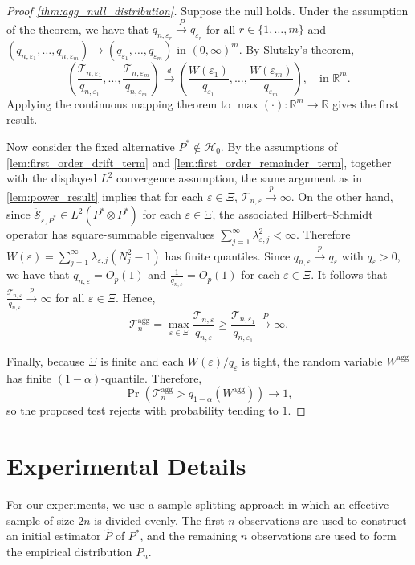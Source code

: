 \documentclass{article}
\theoremstyle{plain}
\theoremstyle{definition}
\theoremstyle{remark}
\newcommand{\R}{\mathbb{R}}
\newcommand{\of}[1]{\left(#1\right)}
\newcommand{\cT}{\mathcal{T}}
\newcommand{\hP}{\widehat{P}}
\newcommand{\1}{\mathbbm{1}}
\newcommand{\STE}{\mathscr{S}}
\newcommand{\eps}{\varepsilon}
\theoremstyle{plain}
\theoremstyle{definition}
\newcommand{\agg}{\textrm{agg}}
\begin{document}
\begin{proof}[Proof \cref{thm:agg_null_distribution}]
  
    Suppose the null holds. Under the assumption of the theorem, we have that $q_{n, \eps_r} \xrightarrow[]{P} q_{\eps_r}$ for all $r \in \{1, \dots, m\}$ and $(q_{n, \eps_1}, \dots, q_{n, \eps_m}) \to (q_{\eps_1}, \dots, q_{\eps_m})$ in $(0, \infty)^m$. 
    By Slutsky's theorem,
    \[
        \of{\frac{\cT_{n, \eps_1}}{q_{n, \eps_1}}, \dots, \frac{\cT_{n, \eps_m}}{q_{n, \eps_m}}} \xrightarrow[]{d} \of{\frac{W(\eps_1)}{q_{\eps_1}}, \dots, \frac{W(\eps_m)}{q_{\eps_m}}}, \quad \text{in } \R^m.
    \]
    Applying the continuous mapping theorem to $\max(\cdot) : \R^m\to \R$ gives the first result.   

    Now consider the fixed alternative $P^*\notin\mathcal H_0$.
    By the assumptions of \cref{lem:first_order_drift_term} and \cref{lem:first_order_remainder_term}, together with the
    displayed $L^2$ convergence assumption, the same argument as in
    \cref{lem:power_result} implies that for each $\eps \in \Xi$, $\mathcal T_{n,\eps}\xrightarrow{p}\infty$.
    On the other hand, since
    $\ddot{\STE}_{\eps,P^*}\in L^2(P^*\otimes P^*)$ for each $\eps\in\Xi$,
    the associated Hilbert--Schmidt operator has square-summable eigenvalues $\sum_{j=1}^\infty \lambda_{\eps,j}^2<\infty$.
    Therefore $W(\eps)=\sum_{j=1}^\infty \lambda_{\eps,j}(N_j^2-1)$
    has finite quantiles. Since $q_{n,\eps}\xrightarrow{p}q_\eps$ with $q_\eps>0$, we have that $q_{n,\eps}=O_p(1)$ and $\frac{1}{q_{n,\eps}}=O_p(1)$ for each $\eps\in\Xi$. It follows that $\frac{\mathcal T_{n,\eps}}{q_{n,\eps}}
    \xrightarrow{p}\infty$ for all $\eps \in \Xi$.
    Hence, 
    \[
    \mathcal T_n^{\mathrm{agg}}
    =
    \max_{\eps\in\Xi}\frac{\mathcal T_{n,\eps}}{q_{n,\eps}}
    \ge
    \frac{\mathcal T_{n,\eps_1}}{q_{n,\eps_1}}
    \xrightarrow{P}\infty.
    \]
    
    Finally, because $\Xi$ is finite and each $W(\eps)/q_\eps$ is tight, the random variable $W^\agg$ has finite $(1-\alpha)$-quantile.
    Therefore,
    \[
    \Pr\!\left(\mathcal T_n^{\mathrm{agg}}>q_{1-\alpha}(W^{\mathrm{agg}})\right)\to 1,
    \]
    so the proposed test rejects with probability tending to $1$.
\end{proof}


\section{Experimental Details}\label{appendix:experiments}
For our experiments, we use a sample splitting approach in which an effective sample of size $2n$ is divided evenly. The first $n$ observations are used to construct an initial estimator $\hP$ of $P^*$, and the remaining $n$ observations are used to form the empirical distribution $P_n$.
\end{document}
